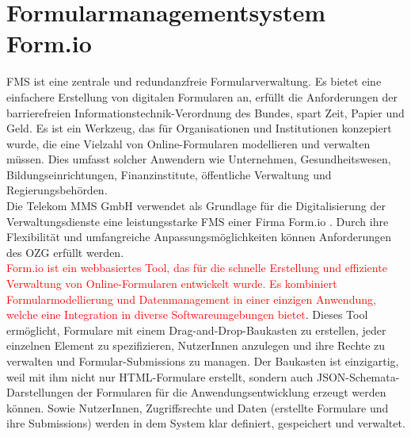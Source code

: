 \section{Formularmanagementsystem Form.io}
\label{sec:Form.io}

FMS ist eine zentrale und redundanzfreie Formularverwaltung. Es bietet eine einfachere Erstellung von digitalen Formularen an, erfüllt die Anforderungen der barrierefreien Informationstechnik-Verordnung des Bundes, spart Zeit, Papier und Geld. Es ist ein Werkzeug, das für Organisationen und Institutionen konzepiert wurde, die eine Vielzahl von Online-Formularen modellieren und verwalten müssen. Dies umfasst solcher Anwendern wie Unternehmen, Gesundheitswesen, Bildungseinrichtungen, Finanzinstitute, öffentliche Verwaltung und Regierungsbehörden. \\

Die Telekom MMS GmbH verwendet als Grundlage für die Digitalisierung der Verwaltungsdienste eine leistungsstarke FMS einer Firma Form.io \citep{formio}. Durch ihre Flexibilität und umfangreiche Anpassungsmöglichkeiten können Anforderungen des OZG erfüllt werden.\\


\textcolor{red}{Form.io ist ein webbasiertes Tool, das für die schnelle Erstellung und effiziente Verwaltung von Online-Formularen entwickelt wurde. Es kombiniert Formularmodellierung und Datenmanagement in einer einzigen Anwendung, welche eine Integration in diverse Softwareumgebungen bietet}. Dieses Tool ermöglicht, Formulare mit einem Drag-and-Drop-Baukasten zu erstellen, jeder einzelnen Element zu spezifizieren, NutzerInnen anzulegen und ihre Rechte zu verwalten und Formular-Submissions zu managen. Der Baukasten ist einzigartig, weil mit ihm nicht nur HTML-Formulare erstellt, sondern auch JSON-Schemata-Darstellungen der Formularen für die Anwendungsentwicklung erzeugt werden können. Sowie NutzerInnen, Zugriffsrechte und Daten (erstellte Formulare und ihre Submissions) werden in dem System klar definiert, gespeichert und verwaltet.\\

